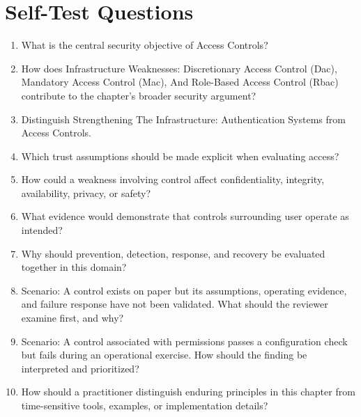 \documentclass[11pt]{article}
\begin{document}
\section*{Self-Test Questions}
\begin{enumerate}
\item What is the central security objective of Access Controls?
\item How does Infrastructure Weaknesses: Discretionary Access Control (Dac), Mandatory Access Control (Mac), And Role-Based Access Control (Rbac) contribute to the chapter's broader security argument?
\item Distinguish Strengthening The Infrastructure: Authentication Systems from Access Controls.
\item Which trust assumptions should be made explicit when evaluating access?
\item How could a weakness involving control affect confidentiality, integrity, availability, privacy, or safety?
\item What evidence would demonstrate that controls surrounding user operate as intended?
\item Why should prevention, detection, response, and recovery be evaluated together in this domain?
\item Scenario: A control exists on paper but its assumptions, operating evidence, and failure response have not been validated. What should the reviewer examine first, and why?
\item Scenario: A control associated with permissions passes a configuration check but fails during an operational exercise. How should the finding be interpreted and prioritized?
\item How should a practitioner distinguish enduring principles in this chapter from time-sensitive tools, examples, or implementation details?
\end{enumerate}
\end{document}
